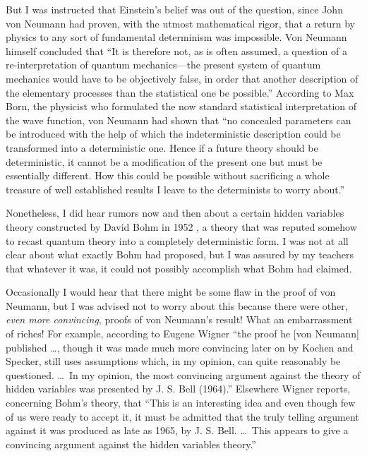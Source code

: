 \documentclass[12pt]{article}
\begin{document}
But I was instructed that Einstein's belief was out of the question,
since John von Neumann had proven, with the utmost mathematical rigor, that
a return by physics to any sort of fundamental determinism was impossible.
Von Neumann himself \cite{vN} concluded that ``It is therefore not, as is
often assumed, a question of a re-interpretation of quantum mechanics---the
present system of quantum mechanics would have to be objectively false, in
order that another description of the elementary processes than the
statistical one be possible.'' According to Max Born, the physicist who
formulated the now standard statistical interpretation of the wave
function, von Neumann had shown that \cite{born} ``no concealed parameters
can be introduced with the help of which the indeterministic description
could be transformed into a deterministic one.  Hence if a future theory
should be deterministic, it cannot be a modification of the present one but
must be essentially different. How this could be possible without
sacrificing a whole treasure of well established results I leave to the
determinists to worry about.''

Nonetheless, I did hear rumors now and then about a certain
hidden variables theory constructed by David Bohm in 1952 \cite{Bohm52}, a
theory that was reputed somehow to recast quantum theory into a completely
deterministic form. I was not at all clear about what exactly Bohm had
proposed, but I was assured by my teachers that whatever it was, it could
not possibly accomplish what Bohm had claimed.

Occasionally I would hear that there might be some flaw in the proof of von
Neumann, but I was advised not to worry about this because there were
other, {\it even more convincing\/}, proofs of von Neumann's result! What
an embarrassment of riches! For example, according to Eugene Wigner \cite[page
291]{Wigner1} ``the proof he [von Neumann] published \dots, though it was
made much more convincing later on by Kochen and Specker, still uses
assumptions which, in my opinion, can quite reasonably be questioned. \dots\
In my opinion, the most convincing argument against the theory of hidden
variables was presented by J. S. Bell (1964).'' Elsewhere \cite{Wigner2}
Wigner reports, concerning Bohm's theory, that ``This is an interesting
idea and even though few of us were ready to accept it, it must be admitted
that the truly telling argument against it was produced as late as 1965, by
J. S.  Bell. \dots\  This appears to give a convincing argument against the
hidden variables theory.''
\end{document}
